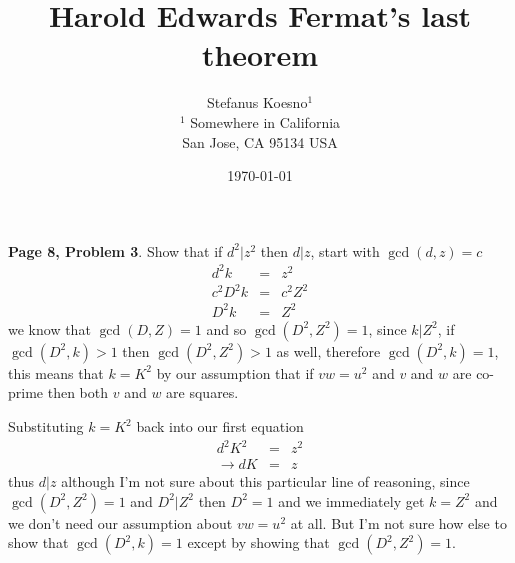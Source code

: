 \documentclass[aps,preprint,preprintnumbers,nofootinbib,showpacs,prd]{revtex4-1}
\newcommand{\nbea}{\begin{eqnarray*}}
\newcommand{\neea}{\end{eqnarray*}}
\begin{document}
\title{Harold Edwards Fermat's last theorem}
\bigskip
\author{Stefanus Koesno$^1$\\
$^1$ Somewhere in California\\ San Jose, CA 95134 USA\\
}
%
\date{\today}
%
\begin{abstract}

\end{abstract}
%
\maketitle

\renewcommand{\theequation}{A.\arabic{equation}}  %
\setcounter{equation}{0}  %

{\bf Page 8, Problem 3}. Show that if $d^2|z^2$ then $d|z$, start with $\gcd(d,z) = c$
%
\nbea
d^2 k & = & z^2 \\
c^2 D^2 k & = & c^2 Z^2 \\
D^2 k & = & Z^2
\neea
%
we know that $\gcd(D,Z) = 1$ and so $\gcd(D^2,Z^2) = 1$, since $k|Z^2$, if $\gcd(D^2,k) > 1$ then $\gcd(D^2,Z^2) > 1$ as well, therefore $\gcd(D^2,k) = 1$, this means that $k = K^2$ by our assumption that if $vw = u^2$ and $v$ and $w$ are co-prime then both $v$ and $w$ are squares.

Substituting $k=K^2$ back into our first equation
%
\nbea
d^2K^2 & = & z^2 \\
\to dK & = & z
\neea
%
thus $d|z$ although I'm not sure about this particular line of reasoning, since $\gcd(D^2,Z^2) = 1$ and $D^2|Z^2$ then $D^2 = 1$ and we immediately get $k=Z^2$ and we don't need our assumption about $vw=u^2$ at all. But I'm not sure how else to show that $\gcd(D^2,k) = 1$ except by showing that $\gcd(D^2,Z^2) = 1$.
\end{document}
